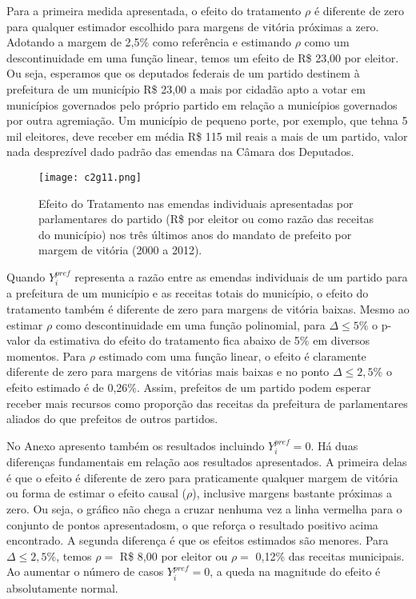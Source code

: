Para a primeira medida apresentada, o efeito do tratamento $\rho$ é diferente de zero para qualquer estimador escolhido para margens de vitória próximas a zero. Adotando a margem de 2,5\% como referência e estimando $\rho$ como um descontinuidade em uma função linear, temos um efeito de R\$ 23,00 por eleitor. Ou seja, esperamos que os deputados federais de um partido destinem à prefeitura de um município R\$ 23,00 a mais por cidadão apto a votar em municípios governados pelo próprio partido em relação a municípios governados por outra agremiação. Um município de pequeno porte, por exemplo, que tehna 5 mil eleitores, deve receber em média R\$ 115 mil reais a mais de um partido, valor nada desprezível dado padrão das emendas na Câmara dos Deputados.

\begin{figure}[htp]
	\centering
	\texttt{[image: c2g11.png]}
	\caption{Efeito do Tratamento nas emendas individuais apresentadas por parlamentares do partido (R\$ por eleitor ou como razão das receitas do município) nos três últimos anos do mandato de prefeito por margem de vitória (2000 a 2012).}
	\label{fig:c2g11}
\end{figure}

Quando $Y_{i}^{pref}$ representa a razão entre as emendas individuais de um partido para a prefeitura de um município e as receitas totais do município, o efeito do tratamento também é diferente de zero para margens de vitória baixas. Mesmo ao estimar $\rho$ como descontinuidade em uma função polinomial, para $\Delta \leq 5\%$ o p-valor da estimativa do efeito do tratamento fica abaixo de 5\% em diversos momentos. Para $\rho$ estimado com uma função linear, o efeito é claramente diferente de zero para margens de vitórias mais baixas e no ponto $\Delta \leq 2,5\%$ o efeito estimado é de 0,26\%. Assim, prefeitos de um partido podem esperar receber mais recursos como proporção das receitas da prefeitura de parlamentares aliados do que prefeitos de outros partidos.

No Anexo apresento também os resultados incluindo $Y_{i}^{pref}=0$. Há duas diferenças fundamentais em relação aos resultados apresentados. A primeira delas é que o efeito é diferente de zero para praticamente qualquer margem de vitória ou forma de estimar o efeito causal ($\rho$), inclusive margens bastante próximas a zero. Ou seja, o gráfico não chega a cruzar nenhuma vez a linha vermelha para o conjunto de pontos apresentadosm, o que reforça o resultado positivo acima encontrado. A segunda diferença é que os efeitos estimados são menores. Para $\Delta \leq 2,5\%$, temos $\rho=$ R\$ 8,00 por eleitor ou $\rho=$ 0,12\% das receitas municipais. Ao aumentar o número de casos $Y_{i}^{pref}=0$, a queda na magnitude do efeito é absolutamente normal.

